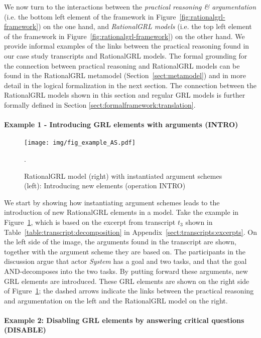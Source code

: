 We now turn to the interactions between the \emph{practical reasoning \& argumentation} (i.e. the bottom left element of the framework in Figure~\ref{fig:rationalgrl-framework}) on the one hand, and \emph{RationalGRL models} (i.e. the top left element of the framework in Figure~\ref{fig:rationalgrl-framework}) on the other hand. We provide informal examples of the links between the practical reasoning found in our case study transcripts and RationalGRL models. The formal grounding for the connection between practical reasoning and RationalGRL models can be found in the RationalGRL metamodel (Section~\ref{sect:metamodel}) and in more detail in the logical formalization in the next section. The connection between the RationalGRL models shown in this section and regular GRL models is further formally defined in Section \ref{sect:formalframework:translation}. 

\paragraph{Example 1 - Introducing GRL elements with arguments (\textsf{INTRO)}}

\begin{figure}[t]
\centering
\texttt{[image: img/fig\_example\_AS.pdf]}
\caption{RationalGRL model (right) with instantiated argument schemes (left): Introducing new elements (operation \textsf{INTRO)}}. 
\label{fig:example_AS}
\end{figure}

We start by showing how instantiating argument schemes leads to the introduction of new RationalGRL elements in a model. Take the example in Figure~\ref{fig:example_AS}, which is based on the excerpt from transcript $t_3$ shown in Table~\ref{table:transcript:decomposition} in Appendix~\ref{sect:transcripts:excerpts}. On the left side of the image, the arguments found in the transcript are shown, together with the argument scheme they are based on. The participants in the discussion argue that actor \emph{System} has a goal and two tasks, and that the goal AND-decomposes into the two tasks. By putting forward these arguments, new GRL elements are introduced. These GRL elements are shown on the right side of Figure~\ref{fig:example_AS}; the dashed arrows indicate the links between the practical reasoning and argumentation on the left and the RationalGRL model on the right.


\paragraph{Example 2: Disabling GRL elements by answering critical questions (\textsf{DISABLE)}}

